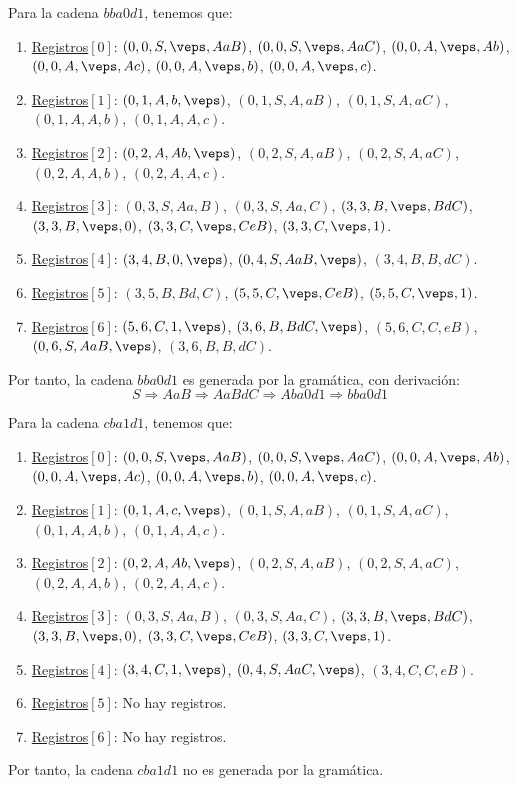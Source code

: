 \begin{ejercicio}
\begin{enumerate}
        Para la cadena $bba0d1$, tenemos que:
        \begin{enumerate}[label=\arabic*), start=0]
            \item \ul{Registros$[0]$}: $(0,0,S,\veps,AaB)$, $(0,0,S,\veps,AaC)$, $(0,0,A,\veps,Ab)$, $(0,0,A,\veps,Ac)$, $(0,0,A,\veps,b)$, $(0,0,A,\veps,c)$.
            \item \ul{Registros$[1]$}: $(0,1,A,b,\veps)$, $(0,1,S,A,aB)$, $(0,1,S,A,aC)$, $(0,1,A,A,b)$, $(0,1,A,A,c)$.
            \item \ul{Registros$[2]$}: $(0,2,A,Ab,\veps)$, $(0,2,S,A,aB)$, $(0,2,S,A,aC)$, $(0,2,A,A,b)$, $(0,2,A,A,c)$.
            \item \ul{Registros$[3]$}: $(0,3,S,Aa,B)$, $(0,3,S,Aa,C)$, $(3,3,B,\veps,BdC)$, $(3,3,B,\veps,0)$, $(3,3,C,\veps,CeB)$, $(3,3,C,\veps,1)$.
            \item \ul{Registros$[4]$}: $(3,4,B,0,\veps)$, $(0,4,S,AaB,\veps)$, $(3,4,B,B,dC)$.
            \item \ul{Registros$[5]$}: $(3,5,B,Bd,C)$, $(5,5,C,\veps,CeB)$, $(5,5,C,\veps,1)$.
            \item \ul{Registros$[6]$}: $(5,6,C,1,\veps)$, $(3,6,B,BdC,\veps)$, $(5,6,C,C,eB)$, $(0,6,S,AaB,\veps)$, $(3,6,B,B,dC)$.
        \end{enumerate}

        Por tanto, la cadena $bba0d1$ es generada por la gramática, con derivación:
        \begin{equation*}
            S\Rightarrow AaB\Rightarrow AaBdC\Rightarrow Aba0d1 \Rightarrow bba0d1
        \end{equation*}

        Para la cadena $cba1d1$, tenemos que:
        \begin{enumerate}[label=\arabic*), start=0]
            \item \ul{Registros$[0]$}: $(0,0,S,\veps,AaB)$, $(0,0,S,\veps,AaC)$, $(0,0,A,\veps,Ab)$, $(0,0,A,\veps,Ac)$, $(0,0,A,\veps,b)$, $(0,0,A,\veps,c)$.
            \item \ul{Registros$[1]$}: $(0,1,A,c,\veps)$, $(0,1,S,A,aB)$, $(0,1,S,A,aC)$, $(0,1,A,A,b)$, $(0,1,A,A,c)$.
            \item \ul{Registros$[2]$}: $(0,2,A,Ab,\veps)$, $(0,2,S,A,aB)$, $(0,2,S,A,aC)$, $(0,2,A,A,b)$, $(0,2,A,A,c)$.
            \item \ul{Registros$[3]$}: $(0,3,S,Aa,B)$, $(0,3,S,Aa,C)$, $(3,3,B,\veps,BdC)$, $(3,3,B,\veps,0)$, $(3,3,C,\veps,CeB)$, $(3,3,C,\veps,1)$.
            \item \ul{Registros$[4]$}: $(3,4,C,1,\veps)$, $(0,4,S,AaC,\veps)$, $(3,4,C,C,eB)$.
            \item \ul{Registros$[5]$}: No hay registros.
            \item \ul{Registros$[6]$}: No hay registros.
        \end{enumerate}

        Por tanto, la cadena $cba1d1$ no es generada por la gramática.
    \end{enumerate}
\end{ejercicio}

